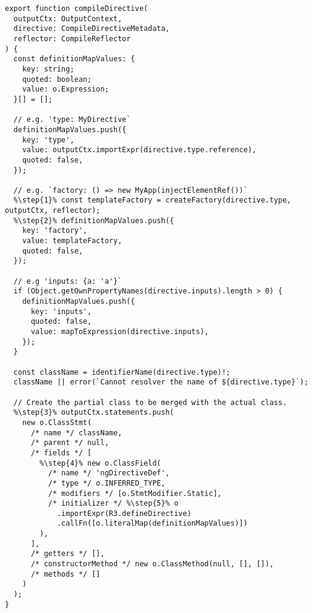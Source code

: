 \begin{verbatim}
export function compileDirective(
  outputCtx: OutputContext,
  directive: CompileDirectiveMetadata,
  reflector: CompileReflector
) {
  const definitionMapValues: {
    key: string;
    quoted: boolean;
    value: o.Expression;
  }[] = [];

  // e.g. 'type: MyDirective`
  definitionMapValues.push({
    key: 'type',
    value: outputCtx.importExpr(directive.type.reference),
    quoted: false,
  });

  // e.g. `factory: () => new MyApp(injectElementRef())`
  %\step{1}% const templateFactory = createFactory(directive.type, outputCtx, reflector);
  %\step{2}% definitionMapValues.push({
    key: 'factory',
    value: templateFactory,
    quoted: false,
  });

  // e.g 'inputs: {a: 'a'}`
  if (Object.getOwnPropertyNames(directive.inputs).length > 0) {
    definitionMapValues.push({
      key: 'inputs',
      quoted: false,
      value: mapToExpression(directive.inputs),
    });
  }

  const className = identifierName(directive.type)!;
  className || error(`Cannot resolver the name of ${directive.type}`);

  // Create the partial class to be merged with the actual class.
  %\step{3}% outputCtx.statements.push(
    new o.ClassStmt(
      /* name */ className,
      /* parent */ null,
      /* fields */ [
        %\step{4}% new o.ClassField(
          /* name */ 'ngDirectiveDef',
          /* type */ o.INFERRED_TYPE,
          /* modifiers */ [o.StmtModifier.Static],
          /* initializer */ %\step{5}% o
            .importExpr(R3.defineDirective)
            .callFn([o.literalMap(definitionMapValues)])
        ),
      ],
      /* getters */ [],
      /* constructorMethod */ new o.ClassMethod(null, [], []),
      /* methods */ []
    )
  );
}
\end{verbatim}
